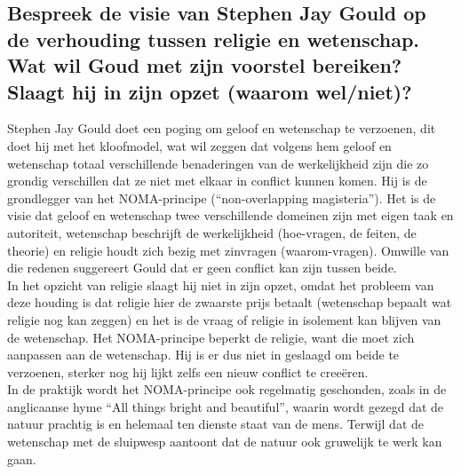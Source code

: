 \documentclass[11pt,a4paper,titlepage]{article}
\begin{document}
\subsection{Bespreek de visie van Stephen Jay Gould op de verhouding tussen religie en wetenschap.
Wat wil Goud met zijn voorstel bereiken? Slaagt hij in zijn opzet (waarom wel/niet)?}
Stephen Jay Gould doet een poging om geloof en wetenschap te verzoenen, dit doet hij met het kloofmodel, wat wil zeggen dat volgens hem geloof en wetenschap totaal verschillende benaderingen van de werkelijkheid zijn die zo grondig verschillen dat ze niet met elkaar in conflict kunnen komen. Hij is de grondlegger van het NOMA-principe (“non-overlapping magisteria”). Het is de visie dat geloof en wetenschap twee verschillende domeinen zijn met eigen taak en autoriteit, wetenschap beschrijft de werkelijkheid (hoe-vragen, de feiten, de theorie) en religie houdt zich bezig met zinvragen (waarom-vragen). Omwille van die redenen suggereert Gould dat er geen conflict kan zijn tussen beide. \\
In het opzicht van religie slaagt hij niet in zijn opzet, omdat het probleem van deze houding is dat religie hier de zwaarste prijs betaalt (wetenschap bepaalt wat religie nog kan zeggen) en het is de vraag of religie in isolement kan blijven van de wetenschap. Het NOMA-principe beperkt de religie, want die moet zich aanpassen aan de wetenschap. Hij is er dus niet in geslaagd om beide te verzoenen, sterker nog hij lijkt zelfs een nieuw conflict te creeëren. \\
In de praktijk wordt het NOMA-principe ook regelmatig geschonden, zoals in de anglicaanse hyme ``All things bright and beautiful”, waarin wordt gezegd dat de natuur prachtig is en helemaal ten dienste staat van de mens. Terwijl dat de wetenschap met de sluipwesp aantoont dat de natuur ook gruwelijk te werk kan gaan. 
\end{document}
